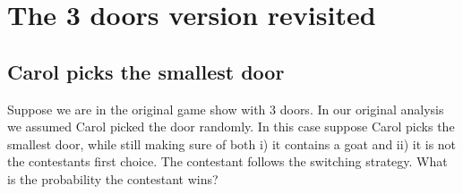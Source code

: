 \documentclass[12pt]{article}
\begin{document}

\newpage
\section{The 3 doors version revisited}

\subsection{Carol picks the smallest door} 

Suppose we are in the original game show with 3 doors. In our original analysis we assumed Carol picked the door randomly. In this case suppose Carol picks the smallest door, while still making sure of both i) it contains a goat and ii) it is not the contestants first choice. The contestant follows the switching strategy. What is the probability the contestant wins? 
\end{document}
